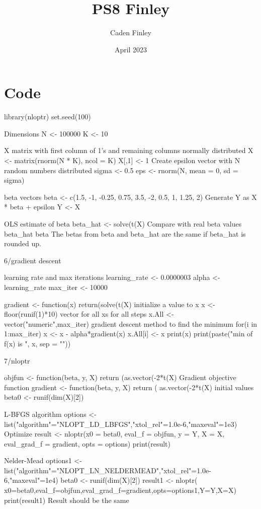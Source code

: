 \documentclass{article}
\title{PS8 Finley}
\author{Caden Finley}
\date{April 2023}
\begin{document}
\maketitle

\section{Code}
library(nloptr)
set.seed(100)

Dimensions
N <- 100000
K <- 10

X matrix with first column of 1's and remaining columns normally distributed
X <- matrix(rnorm(N * K), ncol = K)
X[,1] <- 1
Create epsilon vector with N random numbers distributed
sigma <- 0.5
eps <- rnorm(N, mean = 0, sd = sigma)

beta vectors
beta <- c(1.5, -1, -0.25, 0.75, 3.5, -2, 0.5, 1, 1.25, 2)
Generate Y as X * beta + epsilon
Y <- X %

OLS estimate of beta
beta_hat <- solve(t(X) %
Compare with real beta values
beta_hat
beta
The betas from beta and beta_hat are the same if beta_hat is rounded up.

6/gradient descent 

learning rate and max iterations
learning_rate <- 0.0000003
alpha <- learning_rate
max_iter <- 10000

gradient <- function(x) return(solve(t(X)%
initialize a value to x
x <- floor(runif(1)*10)
vector for all xs for all steps
x.All <- vector("numeric",max_iter)
gradient descent method to find the minimum
for(i in 1:max_iter){
  x <- x - alpha*gradient(x)
  x.All[i] <- x
  print(x)
}
print(paste("min of f(x) is ", x, sep = ""))

7/nloptr

objfun <- function(beta, y, X) {
  return (as.vector(-2*t(X)%
}
Gradient objective function
gradient <- function(beta, y, X) {
  return ( as.vector(-2*t(X)%
}
initial values
beta0 <- runif(dim(X)[2]) 

L-BFGS algorithm
options <- list("algorithm"="NLOPT_LD_LBFGS","xtol_rel"=1.0e-6,"maxeval"=1e3)
Optimize
result <- nloptr(x0 = beta0, eval_f = objfun, y = Y, X = X, eval_grad_f = gradient, opts = options)
print(result)

Nelder-Mead
options1 <- list("algorithm"="NLOPT_LN_NELDERMEAD","xtol_rel"=1.0e-6,"maxeval"=1e4)
beta0 <- runif(dim(X)[2])
result1 <- nloptr( x0=beta0,eval_f=objfun,eval_grad_f=gradient,opts=options1,Y=Y,X=X)
print(result1)
Result should be the same 
\end{document}
